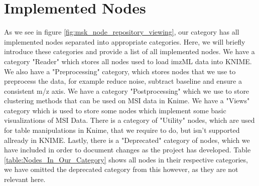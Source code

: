 \documentclass[11pt,openany]{book}
\begin{document}
\section{Implemented Nodes}
As we see in figure \ref{fig:msk_node_repository_viewing}, our category has all implemented nodes separated into appropriate categories. Here, we will briefly introduce these categories and provide a list of all implemented nodes. We have a category "Reader" which stores all nodes used to load imzML data into KNIME. We also have a "Preprocessing" category, which stores nodes that we use to preprocess the data, for example reduce noise, subtract baseline and ensure a consistent m/z axis. We have a category "Postprocessing" which we use to store clustering methods that can be used on MSI data in Knime. We have a "Views" category which is used to store some nodes which implement some basic visualizations of MSI Data. There is a category of "Utility" nodes, which are used for table manipulations in Knime, that we require to do, but isn't supported allready in KNIME. Lastly, there is a "Deprecated" category of nodes, which we have included in order to document changes as the project has developed. Table \ref{table:Nodes_In_Our_Category} shows all nodes in their respective categories, we have omitted the deprecated category from this however, as they are not relevant here. 
\end{document}

